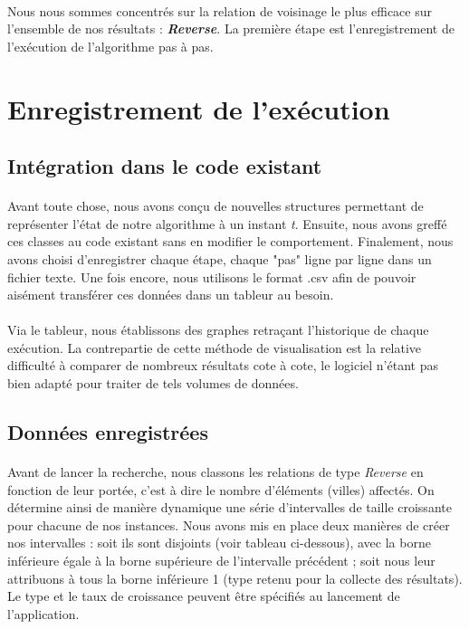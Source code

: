 \documentclass[a4paper,10pt]{report}
\begin{document}
\paragraph{}
Nous nous sommes concentrés sur la relation de voisinage le plus efficace sur
l'ensemble de nos résultats : \textbf{\textit{Reverse}}. La première étape est
l'enregistrement de l'exécution de l'algorithme pas à pas.



\section{Enregistrement de l'exécution}
\subsection{Intégration dans le code existant}

\paragraph{}
  Avant toute chose, nous avons conçu de nouvelles structures permettant de
représenter l'état de notre algorithme à un instant \textit{t}. Ensuite, nous
avons greffé ces classes au code existant sans en modifier le comportement.
Finalement, nous avons choisi d'enregistrer chaque étape, chaque "pas" ligne par
ligne dans un fichier texte. Une fois encore, nous utilisons le format .csv afin
de pouvoir aisément transférer ces données dans un tableur au besoin.

\paragraph{}
  Via le tableur, nous établissons des graphes retraçant l'historique de chaque
exécution. La contrepartie de cette méthode de visualisation est la relative
difficulté à comparer de nombreux résultats cote à cote, le logiciel n'étant pas
bien adapté pour traiter de tels volumes de données.

\subsection{Données enregistrées}

\paragraph{}
  Avant de lancer la recherche, nous classons les relations de type
\textit{Reverse} en fonction de leur portée, c'est à dire le nombre d'éléments
(villes) affectés. On détermine ainsi de manière dynamique une série
d'intervalles de taille croissante pour chacune de nos instances. Nous avons mis
en place deux manières de créer nos intervalles : soit ils sont disjoints (voir
tableau ci-dessous), avec la borne inférieure égale à la borne supérieure de
l'intervalle précédent ; soit nous leur attribuons à tous la borne inférieure 1
(type retenu pour la collecte des résultats). Le type et le taux de croissance
peuvent être spécifiés au lancement de l'application.
\end{document}
